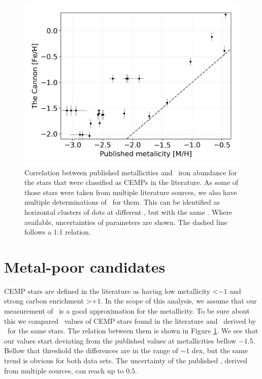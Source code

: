 \begin{figure}
	\centering
	\includegraphics[width=\columnwidth]{cemps_meh_feh.png}
	\caption{Correlation between published metallicities and \TC\ iron abundance for the stars that were classified as CEMPs in the literature. As some of those stars were taken from multiple literature sources, we also have multiple determinations of \Meh\ for them. This can be identified as horizontal clusters of dots at different \Meh, but with the same \Feh. Where available, uncertainties of parameters are shown. The dashed line follows a 1:1 relation.}
	\label{fig:cemps_feh}
\end{figure}

\section{Metal-poor candidates}
\label{sec:cemp}
CEMP stars are defined in the literature as having low metallicity \Meh \textless $-1$ and strong carbon enrichment \Cfe \textgreater $+1$. In the scope of this analysis, we assume that our measurement of \Feh\ is a good approximation for the metallicity. To be sure about this we compared \Meh\ values of CEMP stars found in the literature and \Feh\ derived by \TC\ for the same stars. The relation between them is shown in Figure \ref{fig:cemps_feh}. We see that our values start deviating from the published values at metallicities bellow $-1.5$. Bellow that threshold the differences are in the range of $\sim1$ dex, but the same trend is obvious for both data sets. The uncertainty of the published \Meh, derived from multiple sources, can reach up to $0.5$. 

